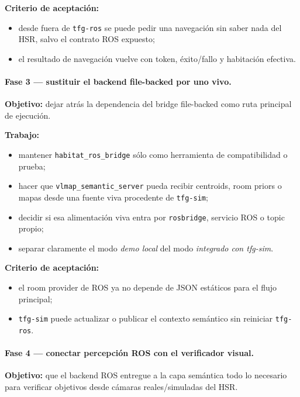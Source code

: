 \documentclass[11pt,a4paper]{article}
\begin{document}
\textbf{Criterio de aceptación:}
\begin{itemize}
  \item desde fuera de \texttt{tfg-ros} se puede pedir una navegación sin saber
        nada del HSR, salvo el contrato ROS expuesto;
  \item el resultado de navegación vuelve con token, éxito/fallo y habitación
        efectiva.
\end{itemize}

\paragraph{Fase 3 --- sustituir el backend file-backed por uno vivo.}

\textbf{Objetivo:} dejar atrás la dependencia del bridge file-backed como ruta
principal de ejecución.

\textbf{Trabajo:}
\begin{itemize}
  \item mantener \texttt{habitat\_ros\_bridge} sólo como herramienta de
        compatibilidad o prueba;
  \item hacer que \texttt{vlmap\_semantic\_server} pueda recibir centroids,
        room priors o mapas desde una fuente viva procedente de
        \texttt{tfg-sim};
  \item decidir si esa alimentación viva entra por \texttt{rosbridge},
        servicio ROS o topic propio;
  \item separar claramente el modo \emph{demo local} del modo \emph{integrado
        con tfg-sim}.
\end{itemize}

\textbf{Criterio de aceptación:}
\begin{itemize}
  \item el room provider de ROS ya no depende de JSON estáticos para el flujo
        principal;
  \item \texttt{tfg-sim} puede actualizar o publicar el contexto semántico sin
        reiniciar \texttt{tfg-ros}.
\end{itemize}

\paragraph{Fase 4 --- conectar percepción ROS con el verificador visual.}

\textbf{Objetivo:} que el backend ROS entregue a la capa semántica todo lo
necesario para verificar objetivos desde cámaras reales/simuladas del HSR.
\end{document}

